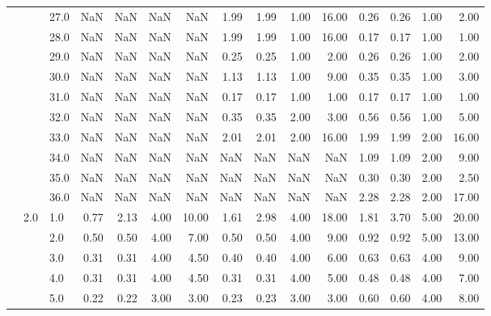 \begin{tabular}{lllrrrrrrrrrrrr}
    &     & 27.0 &        NaN &       NaN &  NaN &    NaN &       1.99 &      1.99 & 1.00 &  16.00 &       0.26 &      0.26 & 1.00 &   2.00 \\
    &     & 28.0 &        NaN &       NaN &  NaN &    NaN &       1.99 &      1.99 & 1.00 &  16.00 &       0.17 &      0.17 & 1.00 &   1.00 \\
    &     & 29.0 &        NaN &       NaN &  NaN &    NaN &       0.25 &      0.25 & 1.00 &   2.00 &       0.26 &      0.26 & 1.00 &   2.00 \\
    &     & 30.0 &        NaN &       NaN &  NaN &    NaN &       1.13 &      1.13 & 1.00 &   9.00 &       0.35 &      0.35 & 1.00 &   3.00 \\
    &     & 31.0 &        NaN &       NaN &  NaN &    NaN &       0.17 &      0.17 & 1.00 &   1.00 &       0.17 &      0.17 & 1.00 &   1.00 \\
    &     & 32.0 &        NaN &       NaN &  NaN &    NaN &       0.35 &      0.35 & 2.00 &   3.00 &       0.56 &      0.56 & 1.00 &   5.00 \\
    &     & 33.0 &        NaN &       NaN &  NaN &    NaN &       2.01 &      2.01 & 2.00 &  16.00 &       1.99 &      1.99 & 2.00 &  16.00 \\
    &     & 34.0 &        NaN &       NaN &  NaN &    NaN &        NaN &       NaN &  NaN &    NaN &       1.09 &      1.09 & 2.00 &   9.00 \\
    &     & 35.0 &        NaN &       NaN &  NaN &    NaN &        NaN &       NaN &  NaN &    NaN &       0.30 &      0.30 & 2.00 &   2.50 \\
    &     & 36.0 &        NaN &       NaN &  NaN &    NaN &        NaN &       NaN &  NaN &    NaN &       2.28 &      2.28 & 2.00 &  17.00 \\
    & 2.0 & 1.0  &       0.77 &      2.13 & 4.00 &  10.00 &       1.61 &      2.98 & 4.00 &  18.00 &       1.81 &      3.70 & 5.00 &  20.00 \\
    &     & 2.0  &       0.50 &      0.50 & 4.00 &   7.00 &       0.50 &      0.50 & 4.00 &   9.00 &       0.92 &      0.92 & 5.00 &  13.00 \\
    &     & 3.0  &       0.31 &      0.31 & 4.00 &   4.50 &       0.40 &      0.40 & 4.00 &   6.00 &       0.63 &      0.63 & 4.00 &   9.00 \\
    &     & 4.0  &       0.31 &      0.31 & 4.00 &   4.50 &       0.31 &      0.31 & 4.00 &   5.00 &       0.48 &      0.48 & 4.00 &   7.00 \\
    &     & 5.0  &       0.22 &      0.22 & 3.00 &   3.00 &       0.23 &      0.23 & 3.00 &   3.00 &       0.60 &      0.60 & 4.00 &   8.00 \\

\end{tabular}
